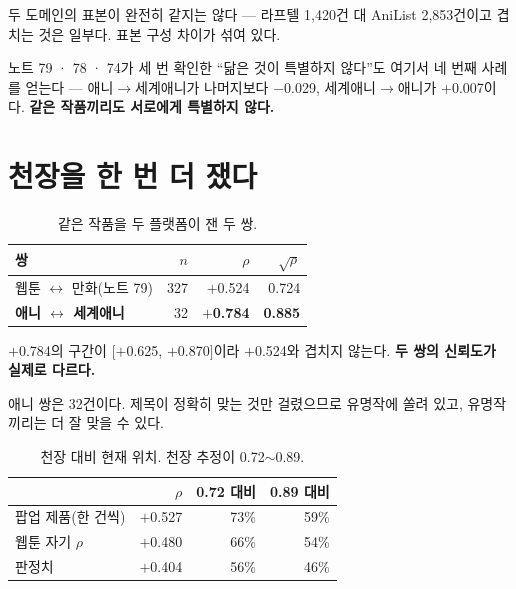 \documentclass[10pt]{article}
\begin{document}
{두 도메인의 표본이 완전히 같지는 않다 --- 라프텔 1,420건 대 AniList 2,853건이고
겹치는 것은 일부다. 표본 구성 차이가 섞여 있다.}

노트 79 · 78 · 74가 세 번 확인한 ``닮은 것이 특별하지 않다''도 여기서 네 번째
사례를 얻는다 --- 애니$\to$세계애니가 나머지보다 $-$0.029, 세계애니$\to$애니가
$+$0.007이다. \textbf{같은 작품끼리도 서로에게 특별하지 않다.}

\section{천장을 한 번 더 쟀다}

\begin{table}[t]
\centering\tsize
\caption{같은 작품을 두 플랫폼이 잰 두 쌍.}
\begin{tabular}{lrrr}
\toprule
쌍 & $n$ & $\rho$ & $\sqrt{\rho}$ \\
\midrule
웹툰 $\leftrightarrow$ 만화(노트 79) & 327 & $+$0.524 & 0.724 \\
\textbf{애니 $\leftrightarrow$ 세계애니} & 32 & \textbf{$+$0.784} & \textbf{0.885} \\
\bottomrule
\end{tabular}
\end{table}

$+$0.784의 구간이 $[+$0.625, $+$0.870$]$이라 $+$0.524와 겹치지 않는다.
\textbf{두 쌍의 신뢰도가 실제로 다르다.}

{애니 쌍은 32건이다. 제목이 정확히 맞는 것만 걸렸으므로 유명작에 쏠려 있고,
유명작끼리는 더 잘 맞을 수 있다.}

\begin{table}[t]
\centering\tsize
\caption{천장 대비 현재 위치. 천장 추정이 0.72$\sim$0.89.}
\begin{tabular}{lrrr}
\toprule
& $\rho$ & 0.72 대비 & 0.89 대비 \\
\midrule
팝업 제품(한 건씩) & $+$0.527 & 73\% & 59\% \\
웹툰 자기 $\rho$ & $+$0.480 & 66\% & 54\% \\
판정치 & $+$0.404 & 56\% & 46\% \\
\bottomrule
\end{tabular}
\end{table}
\end{document}
